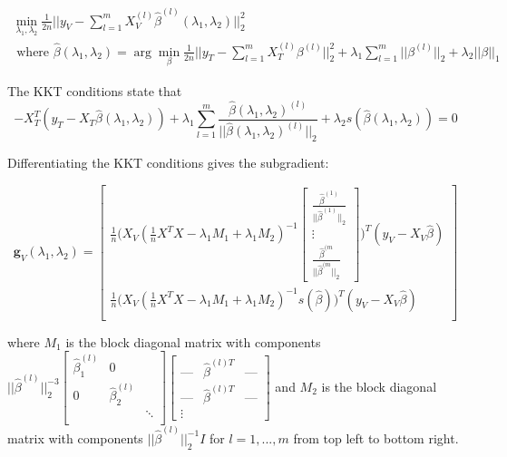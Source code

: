 \documentclass[10pt,letterpaper]{article}
\begin{document}
\begin{equation}
\begin{array}{c}
\min_{\lambda_1, \lambda_2} \frac{1}{2n} \bigl\lvert\bigl\lvert y_V - \sum\limits_{l=1}^m X_V^{(l)} \hat \beta^{(l)}(\lambda_1, \lambda_2) \bigl\rvert\bigl\rvert^2_2 \\
\text{ where }
\hat \beta(\lambda_1, \lambda_2) = \arg\min_\beta \frac{1}{2n} \bigl\lvert\bigl\lvert y_T - \sum\limits_{l=1}^m X_T^{(l)} \beta^{(l)} \bigl\rvert\bigl\rvert^2_2
+ \lambda_1 \sum_{l=1}^m \lvert\lvert \beta^{(l)} \rvert \rvert_2
+ \lambda_2 \lvert\lvert \beta \rvert \rvert_1
\end{array}
\end{equation}

The KKT conditions state that
\begin{equation}
-X_T^T(y_T - X_T \hat \beta(\lambda_1, \lambda_2))
+ \lambda_1 \sum\limits_{l=1}^m \frac{ \hat \beta(\lambda_1, \lambda_2)^{(l)}}{||\hat \beta(\lambda_1, \lambda_2)^{(l)} ||_2}
+ \lambda_2 s(\hat \beta(\lambda_1, \lambda_2)) = 0
\end{equation}

Differentiating the KKT conditions gives the subgradient:

\begin{equation}
\boldsymbol{g}_V(\lambda_1, \lambda_2) =
\begin{bmatrix}
\frac{1}{n}
\Bigg (
X_V
(\frac{1}{n} X^T X - \lambda_1M_1 + \lambda_1 M_2)^{-1}
\begin{bmatrix}
\frac{\hat\beta^{(1)}}{||\hat\beta^{(1)}||_2}\\
\vdots\\
\frac{\hat\beta^{(m}}{||\hat\beta^{(m}||_2}
\end{bmatrix}
\Bigg )^T
(y_V - X_V \hat \beta)
 \\
\frac{1}{n}
\Bigg (X_V
(\frac{1}{n} X^T X - \lambda_1 M_1 + \lambda_1 M_2)^{-1} s(\hat \beta)
\Bigg )^T
(y_V - X_V \hat \beta)
\\ 
\end{bmatrix}
\end{equation}

where $M_1$ is the block diagonal matrix with  components 
$
|| \hat  \beta^{(l)}||_2^{-3}
\begin{bmatrix} 
\hat \beta_1^{(l)} & 0 & \\
0 & \hat \beta_2^{(l)} &  \\
 &  & \ddots \\
\end{bmatrix}
\begin{bmatrix}
\text{---} & \hat \beta^{(l)T} & \text{---} \\
\text{---} & \hat \beta^{(l)T} & \text{---} \\
\vdots
\end{bmatrix}
$ and $M_2$ is the block diagonal matrix with components
$||\hat \beta^{(l)}||_2^{-1} I$
for $l = 1, ..., m$ 
from top left to bottom right.
\end{document}
